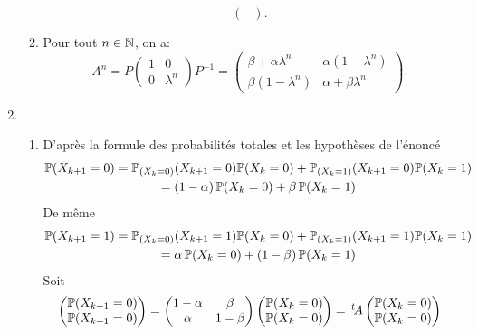 \begin{enumerate}
\begin{enumerate}
\[\begin{pmatrix}
                                                                                    \end{pmatrix}.\]
        \item Pour tout $n\in \mathbb{N}$, on a: 
        \[ A^{n} = P\begin{pmatrix}
                     1 & 0\\
                     0 & \lambda^{n}
                    \end{pmatrix}P^{-1} = \begin{pmatrix}
                                                              \beta + \alpha \lambda^{n} & \alpha (1-\lambda^{n})\\
                                                              \beta (1-\lambda^{n}) & \alpha + \beta \lambda^{n}
                                                 \end{pmatrix}.\]

          \end{enumerate}
          
          
 \item 
 \begin{enumerate}
  \item D'après la formule des probabilités totales et les hypothèses de l'énoncé
\begin{multline*}
 \mathbb{P}(X_{k+1}=0) = \mathbb{P}_{(X_k = 0)}(X_{k+1}=0)\mathbb{P}(X_k = 0) + \mathbb{P}_{(X_k = 1)}(X_{k+1}=0)\mathbb{P}(X_k = 1)\\
 = (1-\alpha)\,\mathbb{P}(X_k = 0) + \beta\,\mathbb{P}(X_k = 1)
\end{multline*}
De même
\begin{multline*}
 \mathbb{P}(X_{k+1}=1) = \mathbb{P}_{(X_k = 0)}(X_{k+1}=1)\mathbb{P}(X_k = 0) + \mathbb{P}_{(X_k = 1)}(X_{k+1}=1)\mathbb{P}(X_k = 1)\\
 = \alpha\,\mathbb{P}(X_k = 0) + (1-\beta)\,\mathbb{P}(X_k = 1)
\end{multline*}
Soit
\begin{displaymath}
 \begin{pmatrix}
\mathbb{P}(X_{k+1}=0) \\ \mathbb{P}(X_{k+1}=0) 
 \end{pmatrix}
=
\begin{pmatrix}
 1- \alpha & \beta \\ \alpha & 1-\beta
\end{pmatrix}
 \begin{pmatrix}
\mathbb{P}(X_{k}=0) \\ \mathbb{P}(X_{k}=0) 
 \end{pmatrix}
= \,\mathstrut^t\!{A} 
 \begin{pmatrix}
\mathbb{P}(X_{k}=0) \\ \mathbb{P}(X_{k}=0) 
 \end{pmatrix}
\end{displaymath}


\end{enumerate}
\end{enumerate}
